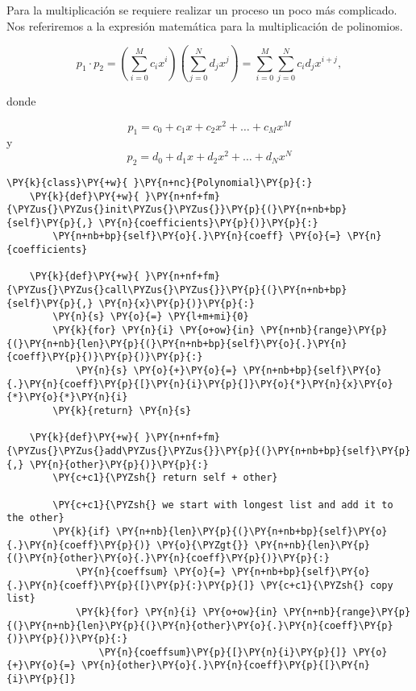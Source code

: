 \begin{example}
Para la multiplicación se requiere realizar un proceso un poco más
complicado. Nos referiremos a la expresión matemática para la
multiplicación de polinomios.

\[ p_1 \cdot p_2 = \left( \sum_{i=0}^M c_ix^i \right) \left( \sum_{j=0}^N d_jx^j \right) = \sum_{i=0}^M \sum_{j=0}^N c_id_jx^{i+j}, \]

donde

\[p_1 = c_0 + c_1x + c_2x^2 + \dots + c_Mx^M \] y
\[p_2 = d_0 + d_1x + d_2x^2 + \dots + d_Nx^N \]

\begin{tcolorbox}[breakable, size=fbox, boxrule=1pt, pad at break*=1mm,colback=cellbackground, colframe=cellborder]
\begin{Verbatim}[commandchars=\\\{\}]
\PY{k}{class}\PY{+w}{ }\PY{n+nc}{Polynomial}\PY{p}{:}
    \PY{k}{def}\PY{+w}{ }\PY{n+nf+fm}{\PYZus{}\PYZus{}init\PYZus{}\PYZus{}}\PY{p}{(}\PY{n+nb+bp}{self}\PY{p}{,} \PY{n}{coefficients}\PY{p}{)}\PY{p}{:}
        \PY{n+nb+bp}{self}\PY{o}{.}\PY{n}{coeff} \PY{o}{=} \PY{n}{coefficients}

    \PY{k}{def}\PY{+w}{ }\PY{n+nf+fm}{\PYZus{}\PYZus{}call\PYZus{}\PYZus{}}\PY{p}{(}\PY{n+nb+bp}{self}\PY{p}{,} \PY{n}{x}\PY{p}{)}\PY{p}{:}
        \PY{n}{s} \PY{o}{=} \PY{l+m+mi}{0}
        \PY{k}{for} \PY{n}{i} \PY{o+ow}{in} \PY{n+nb}{range}\PY{p}{(}\PY{n+nb}{len}\PY{p}{(}\PY{n+nb+bp}{self}\PY{o}{.}\PY{n}{coeff}\PY{p}{)}\PY{p}{)}\PY{p}{:}
            \PY{n}{s} \PY{o}{+}\PY{o}{=} \PY{n+nb+bp}{self}\PY{o}{.}\PY{n}{coeff}\PY{p}{[}\PY{n}{i}\PY{p}{]}\PY{o}{*}\PY{n}{x}\PY{o}{*}\PY{o}{*}\PY{n}{i}
        \PY{k}{return} \PY{n}{s}
    
    \PY{k}{def}\PY{+w}{ }\PY{n+nf+fm}{\PYZus{}\PYZus{}add\PYZus{}\PYZus{}}\PY{p}{(}\PY{n+nb+bp}{self}\PY{p}{,} \PY{n}{other}\PY{p}{)}\PY{p}{:}
        \PY{c+c1}{\PYZsh{} return self + other}

        \PY{c+c1}{\PYZsh{} we start with longest list and add it to the other}
        \PY{k}{if} \PY{n+nb}{len}\PY{p}{(}\PY{n+nb+bp}{self}\PY{o}{.}\PY{n}{coeff}\PY{p}{)} \PY{o}{\PYZgt{}} \PY{n+nb}{len}\PY{p}{(}\PY{n}{other}\PY{o}{.}\PY{n}{coeff}\PY{p}{)}\PY{p}{:}
            \PY{n}{coeffsum} \PY{o}{=} \PY{n+nb+bp}{self}\PY{o}{.}\PY{n}{coeff}\PY{p}{[}\PY{p}{:}\PY{p}{]} \PY{c+c1}{\PYZsh{} copy list}
            \PY{k}{for} \PY{n}{i} \PY{o+ow}{in} \PY{n+nb}{range}\PY{p}{(}\PY{n+nb}{len}\PY{p}{(}\PY{n}{other}\PY{o}{.}\PY{n}{coeff}\PY{p}{)}\PY{p}{)}\PY{p}{:}
                \PY{n}{coeffsum}\PY{p}{[}\PY{n}{i}\PY{p}{]} \PY{o}{+}\PY{o}{=} \PY{n}{other}\PY{o}{.}\PY{n}{coeff}\PY{p}{[}\PY{n}{i}\PY{p}{]}


\end{Verbatim}
\end{tcolorbox}
\end{example}
